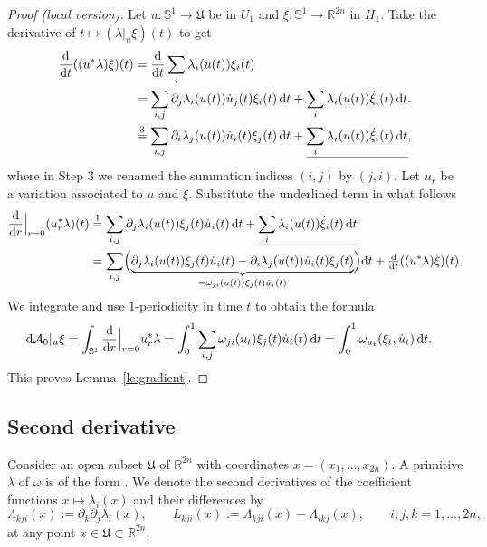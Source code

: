 \documentclass[pdftex]{sigma}
\numberwithin{equation}{section}
\newcommand{\R}{{\mathbb{R}}}
\renewcommand{\SS}{{\mathbb{S}}}
\newcommand{\Aa}{{\mathcal{A}}} %
\newcommand{\p}{{\partial}}
\newcommand{\1}{{{\mathchoice {\rm 1\mskip-4mu l} {\rm 1\mskip-4mu l}
{\rm 1\mskip-4.5mu l} {\rm 1\mskip-5mu l}}}}
\begin{document}
\begin{proof}[Proof (local version)]
Let $u\colon\SS^1\to \mathfrak{U}$ be in $U_1$ and
$\xi\colon\SS^1\to\R^{2n}$ in $H_1$.
Take the derivative of $t\mapsto (\lambda|_u\xi)(t)$ to get
\begin{equation*}
\begin{split}
 \frac{{\rm d}}{{\rm d}t} ((u^*\lambda) \xi )(t)
 &=\frac{{\rm d}}{{\rm d}t}\sum_i\lambda_i(u(t))\xi_i(t) \\
 &=\sum_{i,j} \p_j\lambda_i(u(t))\dot u_j(t) \xi_i(t)\, {\rm d}t
 +\sum_i \lambda_i(u(t)) \dot\xi_i(t)\, {\rm d}t .
\\
 &\stackrel{3}{=}\sum_{i,j} \p_i\lambda_j(u(t))\dot u_i(t) \xi_j(t)\, {\rm d}t
 +\underline{\sum_i \lambda_i(u(t)) \dot\xi_i(t)\, {\rm d}t},
\end{split}
\end{equation*}
where in Step 3 we renamed the summation indices $(i,j)$ by $(j,i)$.
Let $u_r$ be a variation associated to $u$ and $\xi$.
Substitute the underlined term in what follows
\begin{align}
 \frac{{\rm d}}{{\rm d}r}\Big|_{r=0}
 (u_r^*\lambda )(t)
 &\stackrel{1}{=}\sum_{i,j} \p_j\lambda_i(u(t)) \xi_j(t) \dot u_i(t)\, {\rm d}t
 +\underline{\sum_i \lambda_i(u(t)) \dot\xi_i(t)\, {\rm d}t}\nonumber\\
 &=\sum_{i,j}
 \Bigl(
 \underbrace{\p_j\lambda_i(u(t)) \xi_j(t) \dot u_i(t)
 -\p_i\lambda_j(u(t))\dot u_i(t) \xi_j(t)}
 _{=\omega_{ji}(u(t)) \xi_j(t)\dot u_i(t)}
 \Bigr) {\rm d}t
 +\tfrac{{\rm d}}{{\rm d}t} ((u^*\lambda) \xi )(t) .\label{eq:hjvghv46yg}
\end{align}
We integrate and use $1$-periodicity in time $t$ to obtain the formula
\begin{equation*}%
\begin{split}
 {\rm d}\Aa_0|_u\xi
 =\int_{\SS^1}\frac{{\rm d}}{{\rm d}r}\Big|_{r=0} u_r^*\lambda
 &=\int_0^1 \sum_{i,j} \omega_{ji}(u_t) \xi_j(t)\dot u_i(t) \, {\rm d}t
 =\int_0^1\omega_{u_t}(\xi_t,\dot u_t)\, {\rm d}t .
\end{split}
\end{equation*}
This proves Lemma~\ref{le:gradient}.
\end{proof}

\subsection{Second derivative}

Consider an open subset $\mathfrak{U}$
of $\R^{2n}$ with coordinates $x=(x_1,\dots,x_{2n})$.
A primitive $\lambda$ of $\omega$
is of the form .
We denote the second derivatives of the coefficient functions
$x\mapsto \lambda_i(x)$ and their differences by
\[
 \Lambda_{kji}(x):=\p_k\p_j\lambda_i(x)
 ,\qquad
 L_{kji}(x):=\Lambda_{kji}(x)-\Lambda_{ikj}(x)
 ,\qquad
 i,j,k=1,\dots,2n,
\]
at any point $x\in\mathfrak{U}\subset\R^{2n}$.
\end{document}
